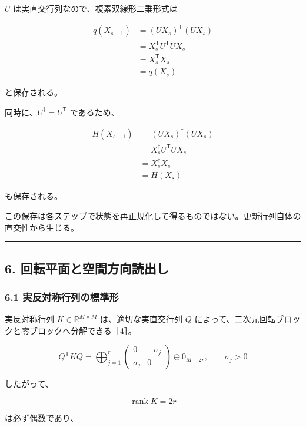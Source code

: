 \documentclass[
  10pt,
  a4paper,
]{article}
\begin{document}
\(U\) は実直交行列なので、複素双線形二乗形式は

\[
\begin{aligned}
q(X_{s+1})
&=
(UX_s)^{\mathsf T}(UX_s)\\
&=
X_s^{\mathsf T}U^{\mathsf T}UX_s\\
&=
X_s^{\mathsf T}X_s\\
&=q(X_s)
\end{aligned}
\]

と保存される。

同時に、\(U^\dagger=U^{\mathsf T}\) であるため、

\[
\begin{aligned}
H(X_{s+1})
&=
(UX_s)^\dagger(UX_s)\\
&=
X_s^\dagger U^{\mathsf T}UX_s\\
&=
X_s^\dagger X_s\\
&=H(X_s)
\end{aligned}
\]

も保存される。

この保存は各ステップで状態を再正規化して得るものではない。更新行列自体の直交性から生じる。

\begin{center}\rule{0.5\linewidth}{0.5pt}\end{center}

\subsection{6.
回転平面と空間方向読出し}\label{ux56deux8ee2ux5e73ux9762ux3068ux7a7aux9593ux65b9ux5411ux8aadux51faux3057}

\subsubsection{6.1
実反対称行列の標準形}\label{ux5b9fux53cdux5bfeux79f0ux884cux5217ux306eux6a19ux6e96ux5f62}

実反対称行列 \(K\in\mathbb R^{M\times M}\) は、適切な実直交行列 \(Q\)
によって、二次元回転ブロックと零ブロックへ分解できる［4］。

\[
Q^{\mathsf T}KQ
=
\bigoplus_{j=1}^{r}
\begin{pmatrix}
0 & -\sigma_j\\
\sigma_j & 0
\end{pmatrix}
\oplus
0_{M-2r},
\qquad
\sigma_j>0
\]

したがって、

\[
\operatorname{rank}K=2r
\]

は必ず偶数であり、
\end{document}

